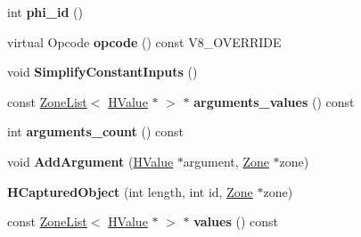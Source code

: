 \begin{DoxyCompactItemize}
\item 
\hypertarget{classv8_1_1internal_1_1_v8___f_i_n_a_l_a8386b160820fcab9e662658d15996307}{}int {\bfseries phi\+\_\+id} ()\label{classv8_1_1internal_1_1_v8___f_i_n_a_l_a8386b160820fcab9e662658d15996307}

\item 
\hypertarget{classv8_1_1internal_1_1_v8___f_i_n_a_l_a7133ae61c5991a200139aaf073cef247}{}virtual Opcode {\bfseries opcode} () const V8\+\_\+\+O\+V\+E\+R\+R\+I\+D\+E\label{classv8_1_1internal_1_1_v8___f_i_n_a_l_a7133ae61c5991a200139aaf073cef247}

\item 
\hypertarget{classv8_1_1internal_1_1_v8___f_i_n_a_l_a5947ebed200284960ca9664eb162cbdd}{}void {\bfseries Simplify\+Constant\+Inputs} ()\label{classv8_1_1internal_1_1_v8___f_i_n_a_l_a5947ebed200284960ca9664eb162cbdd}

\item 
\hypertarget{classv8_1_1internal_1_1_v8___f_i_n_a_l_aa73a49cf29643a158e266e0b137d6f81}{}const \hyperlink{classv8_1_1internal_1_1_zone_list}{Zone\+List}$<$ \hyperlink{classv8_1_1internal_1_1_h_value}{H\+Value} $\ast$ $>$ $\ast$ {\bfseries arguments\+\_\+values} () const \label{classv8_1_1internal_1_1_v8___f_i_n_a_l_aa73a49cf29643a158e266e0b137d6f81}

\item 
\hypertarget{classv8_1_1internal_1_1_v8___f_i_n_a_l_a692779c6a2d1c9498d2c9efeb023ab16}{}int {\bfseries arguments\+\_\+count} () const \label{classv8_1_1internal_1_1_v8___f_i_n_a_l_a692779c6a2d1c9498d2c9efeb023ab16}

\item 
\hypertarget{classv8_1_1internal_1_1_v8___f_i_n_a_l_a6a35290532668c34b10f72ed55a83e9d}{}void {\bfseries Add\+Argument} (\hyperlink{classv8_1_1internal_1_1_h_value}{H\+Value} $\ast$argument, \hyperlink{classv8_1_1internal_1_1_zone}{Zone} $\ast$zone)\label{classv8_1_1internal_1_1_v8___f_i_n_a_l_a6a35290532668c34b10f72ed55a83e9d}

\item 
\hypertarget{classv8_1_1internal_1_1_v8___f_i_n_a_l_afa6d12b971b9f035f8848a653704b81d}{}{\bfseries H\+Captured\+Object} (int length, int id, \hyperlink{classv8_1_1internal_1_1_zone}{Zone} $\ast$zone)\label{classv8_1_1internal_1_1_v8___f_i_n_a_l_afa6d12b971b9f035f8848a653704b81d}

\item 
\hypertarget{classv8_1_1internal_1_1_v8___f_i_n_a_l_a95478cf8ead322da12bb0bde14ab5acd}{}const \hyperlink{classv8_1_1internal_1_1_zone_list}{Zone\+List}$<$ \hyperlink{classv8_1_1internal_1_1_h_value}{H\+Value} $\ast$ $>$ $\ast$ {\bfseries values} () const \label{classv8_1_1internal_1_1_v8___f_i_n_a_l_a95478cf8ead322da12bb0bde14ab5acd}


\end{DoxyCompactItemize}
